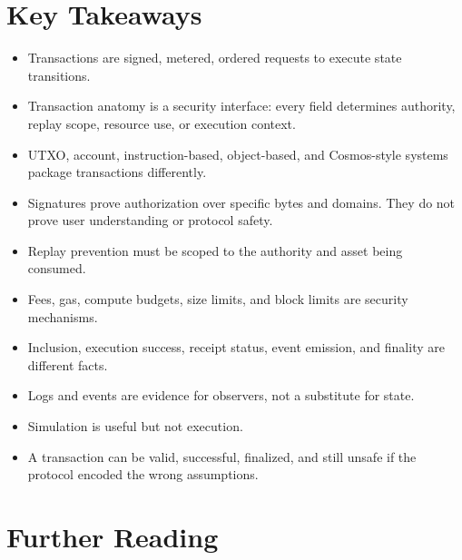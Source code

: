 \section{Key Takeaways}

\begin{itemize}
\tightlist
\item
  Transactions are signed, metered, ordered requests to execute state
  transitions.
\item
  Transaction anatomy is a security interface: every field determines
  authority, replay scope, resource use, or execution context.
\item
  UTXO, account, instruction-based, object-based, and Cosmos-style
  systems package transactions differently.
\item
  Signatures prove authorization over specific bytes and domains. They
  do not prove user understanding or protocol safety.
\item
  Replay prevention must be scoped to the authority and asset being
  consumed.
\item
  Fees, gas, compute budgets, size limits, and block limits are security
  mechanisms.
\item
  Inclusion, execution success, receipt status, event emission, and
  finality are different facts.
\item
  Logs and events are evidence for observers, not a substitute for
  state.
\item
  Simulation is useful but not execution.
\item
  A transaction can be valid, successful, finalized, and still unsafe if
  the protocol encoded the wrong assumptions.
\end{itemize}

\section{Further Reading}

